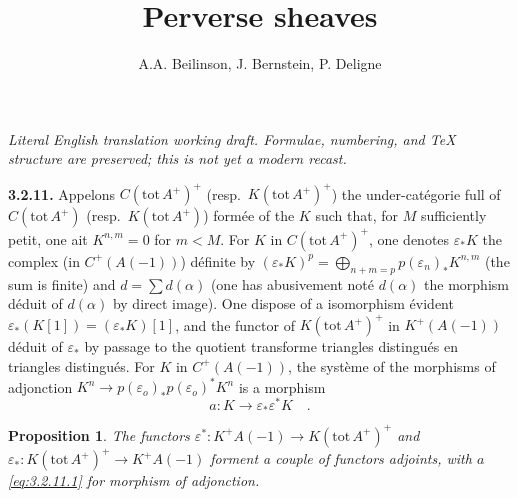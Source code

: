 \documentclass[12pt,a4paper]{article}
\title{Perverse sheaves}
\author{A.A. Beilinson, J. Bernstein, P. Deligne}
\date{}
\theoremstyle{plain}
\newtheorem{proposition}[theorem]{Proposition}
\theoremstyle{definition}
\begin{document}
\begin{center}\small\emph{Literal English translation working draft. Formulae, numbering, and TeX structure are preserved; this is not yet a modern recast.}\end{center}
\vspace{0.5em}

\maketitle
\thispagestyle{empty}



\noindent\textbf{3.2.11.} Appelons $C(\mathrm{tot}\, A^{+})^{+}$ (resp.\ $K(\mathrm{tot}\, A^{+})^{+}$) the under-cat\'{e}gorie full of $C(\mathrm{tot}\, A^{+})$ (resp.\ $K(\mathrm{tot}\, A^{+})$) form\'{e}e of the $K$ such that, for $M$ sufficiently petit, one ait $K^{n,m} = 0$ for $m < M$. For $K$ in $C(\mathrm{tot}\, A^{+})^{+}$, one denotes $\varepsilon_{*}K$ the complex (in $C^{+}(A(-1))$) d\'{e}finite by $(\varepsilon_{*}K)^{p} = \bigoplus_{n+m=p} p(\varepsilon_{n})_{*}K^{n,m}$ (the sum is finite) and $d = \sum d(\alpha)$ (one has abusivement not\'{e} $d(\alpha)$ the morphism d\'{e}duit of $d(\alpha)$ by direct image). One dispose of a isomorphism \'{e}vident $\varepsilon_{*}(K[1]) = (\varepsilon_{*}K)[1]$, and the functor of $K(\mathrm{tot}\, A^{+})^{+}$ in $K^{+}(A(-1))$ d\'{e}duit of $\varepsilon_{*}$ by passage to the quotient transforme triangles distingu\'{e}s en triangles distingu\'{e}s. For $K$ in $C^{+}(A(-1))$, the syst\`{e}me of the morphisms of adjonction $K^{n} \to p(\varepsilon_{o})_{*}p(\varepsilon_{o})^{*}K^{n}$ is a morphism
\begin{equation}\label{eq:3.2.11.1}
a : K \longrightarrow \varepsilon_{*}\varepsilon^{*}K\quad.
\end{equation}

\begin{proposition}\label{prop:3.2.12}
The functors $\varepsilon^{*}: K^{+}A(-1) \longrightarrow K(\mathrm{tot}\, A^{+})^{+}$ and $\varepsilon_{*}: K(\mathrm{tot}\, A^{+})^{+} \longrightarrow K^{+}A(-1)$ forment a couple of functors adjoints, with $a$ \eqref{eq:3.2.11.1} for morphism of adjonction.
\end{proposition}
\end{document}
